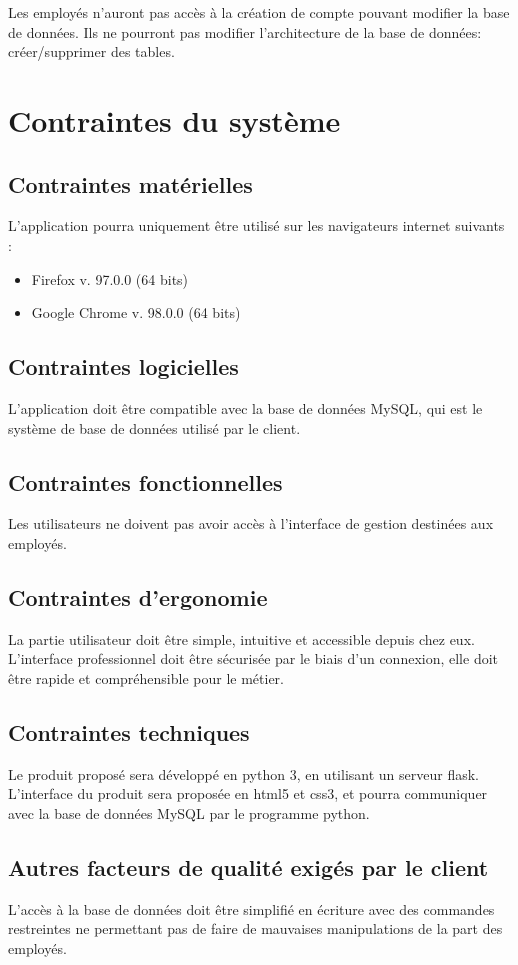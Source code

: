 \documentclass[french]{article}
\begin{document}
Les employés n’auront pas accès à la création de compte pouvant modifier la base de données. 
Ils ne pourront pas modifier l’architecture de la base de données:  créer/supprimer des tables.

\section{Contraintes du système}

\subsection{Contraintes matérielles}

L'application pourra uniquement être utilisé sur les navigateurs internet suivants :
\begin{itemize}
    \item Firefox v. 97.0.0 (64 bits)
    \item Google Chrome v. 98.0.0 (64 bits)
\end{itemize}

\subsection{Contraintes logicielles}

L'application doit être compatible avec la base de données MySQL, qui est le système de base de données utilisé par le client.

\subsection{Contraintes fonctionnelles}

Les utilisateurs ne doivent pas avoir accès à l'interface de gestion destinées aux employés.

\subsection{Contraintes d'ergonomie}

La partie utilisateur doit être simple, intuitive et accessible depuis chez eux. L'interface professionnel doit être sécurisée par le biais d'un connexion, elle doit être rapide et compréhensible pour le métier.

\subsection{Contraintes techniques}

Le produit proposé sera développé en python 3, en utilisant un serveur flask. L’interface du produit sera proposée en html5 et css3, et pourra communiquer avec la base de données MySQL par le programme python.

\subsection{Autres facteurs de qualité exigés par le client}

L'accès à la base de données doit être simplifié en écriture avec des commandes restreintes ne permettant pas de faire de mauvaises manipulations de la part des employés.
\end{document}
